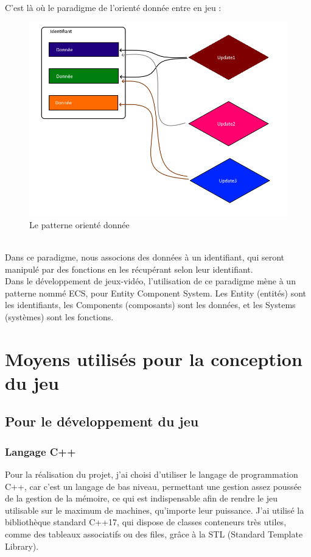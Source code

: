 \documentclass[12pt, openany]{report}
\begin{document}
\\
\indent C'est l\`a o\`u le paradigme de l'orient\'e donn\'ee entre en jeu : \\[0.2cm]
\begin{figure}[!h]
\centering
\includegraphics[scale=0.7]{illustrationOD.png}
\caption{Le patterne orient\'e donn\'ee}
\end{figure}
\\[0.2cm]
\indent Dans ce paradigme, nous associons des donn\'ees \`a un identifiant, qui seront manipul\'e par des fonctions en les r\'ecup\'erant selon leur identifiant.
\\
\indent Dans le d\'eveloppement de jeux-vid\'eo, l'utilisation de ce paradigme m\`ene \`a un patterne nomm\'e ECS, pour Entity Component System. Les Entity (entit\'es) sont les identifiants, les Components (composants) sont les donn\'ees, et les Systems (syst\`emes) sont les fonctions. %

\chapter{Moyens utilis\'es pour la conception du jeu}

\vspace{1cm}
\section{Pour le d\'eveloppement du jeu}
\subsection{Langage C++}
Pour la r\'ealisation du projet, j'ai choisi d'utiliser le langage de programmation C++, car c'est un langage de bas niveau, permettant une gestion assez pouss\'ee de la gestion de la m\'emoire, ce qui est indispensable afin de rendre le jeu utilisable sur le maximum de machines, qu'importe leur puissance. J'ai utilis\'e la biblioth\`eque standard C++17, qui dispose de classes conteneurs tr\`es utiles, comme des tableaux associatifs ou des files, grâce \`a la STL (Standard Template Library).
\end{document}
